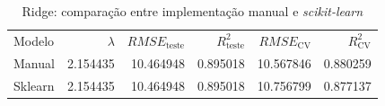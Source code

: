 \begin{table}[t]
  \centering
  \caption{Ridge: comparação entre implementação manual e \textit{scikit-learn}}
  \label{tab:resultados_ridge}
\begin{tabular}{lrrrrr}
Modelo & $\lambda$ & $RMSE_\text{teste}$ & $R^{2}_\text{teste}$ & $RMSE_\text{CV}$ & $R^{2}_\text{CV}$ \\
Manual & 2.154435 & 10.464948 & 0.895018 & 10.567846 & 0.880259 \\
Sklearn & 2.154435 & 10.464948 & 0.895018 & 10.756799 & 0.877137 \\
\end{tabular}

\end{table}
